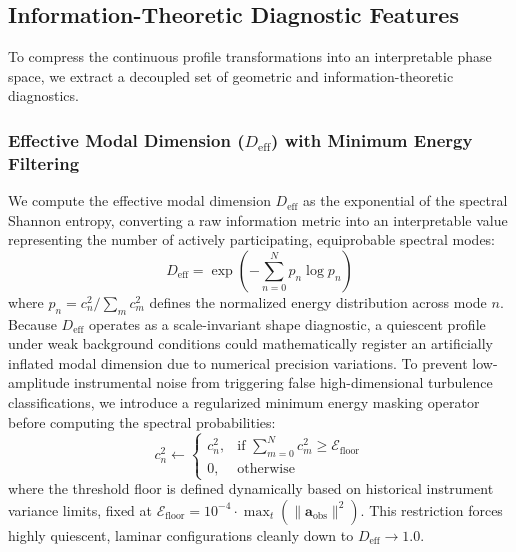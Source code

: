 \subsection{Information-Theoretic Diagnostic Features}
\label{sec:methods:diagnostics}

To compress the continuous profile transformations into an interpretable phase space, we extract a decoupled set of geometric and information-theoretic diagnostics.

\subsubsection{Effective Modal Dimension ($D_{\mathrm{eff}}$) with Minimum Energy Filtering}

We compute the effective modal dimension $D_{\mathrm{eff}}$ as the exponential of the spectral Shannon entropy, converting a raw information metric into an interpretable value representing the number of actively participating, equiprobable spectral modes:
\begin{equation}
D_{\mathrm{eff}} = \exp\left( -\sum_{n=0}^{N} p_n \log p_n \right)
\label{eq:d_eff_def}
\end{equation}
where $p_n = c_n^2 / \sum_{m} c_m^2$ defines the normalized energy distribution across mode $n$. Because $D_{\mathrm{eff}}$ operates as a scale-invariant shape diagnostic, a quiescent profile under weak background conditions could mathematically register an artificially inflated modal dimension due to numerical precision variations. To prevent low-amplitude instrumental noise from triggering false high-dimensional turbulence classifications, we introduce a regularized minimum energy masking operator before computing the spectral probabilities:
\begin{equation}
c_n^2 \leftarrow \begin{cases}
c_n^2, & \text{if } \sum_{m=0}^{N} c_m^2 \ge \mathcal{E}_{\text{floor}} \\
0, & \text{otherwise}
\end{cases}
\label{eq:energy_floor}
\end{equation}
where the threshold floor is defined dynamically based on historical instrument variance limits, fixed at $\mathcal{E}_{\text{floor}} = 10^{-4} \cdot \max_{t} \left(\|\mathbf{a}_{\mathrm{obs}}\|^2\right)$. This restriction forces highly quiescent, laminar configurations cleanly down to $D_{\mathrm{eff}} \to 1.0$.


